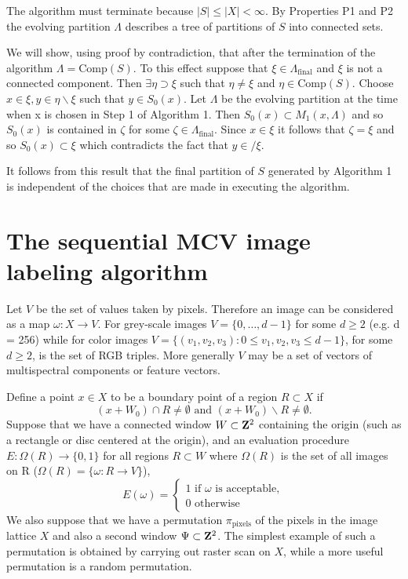 \documentclass[12pt,twoside]{article}
\newcommand{\slas}[1]{\mbox{${{#1} \!\!\! /}$}}
\begin{document}
The algorithm must terminate because $|S| \leq|X|< \infty$. By Properties P1 and P2 the evolving
partition $\Lambda$ describes a tree of partitions of $S$ into connected sets.

We will show, using proof by contradiction, that after the termination of the algorithm $\Lambda = \mbox{Comp}(S)$. To this effect suppose that $\xi\in \Lambda_{\mbox{final}}$ and $\xi$ is not a connected component. Then $\exists\eta\supset\xi$
such that $\eta\neq\xi$ and $\eta\in\mbox{Comp}(S)$. Choose $x \in \xi, y \in \eta\backslash\xi$  such that $y \in S_0(x)$. Let $\Lambda$ be the evolving partition at the time when x is chosen in Step 1 of Algorithm 1. Then $S_0(x) \subset M_1(x,\Lambda)$
and so $S_0(x)$ is contained in $\zeta$ for some $\zeta\in\Lambda_{\mbox{final}}$. Since $x \in \xi$ it follows that $\zeta=\xi$ and so $S_0(x) \subset\xi$ which contradicts the fact that $y {\slas \in}\xi$.

It follows from this result that the final partition of $S$ generated by Algorithm 1 is independent
of the choices that are made in executing the algorithm.

\section{The sequential MCV image labeling algorithm}

Let $V$ be the set of values taken by pixels. Therefore an image can be considered as a map $\omega : X\rightarrow V$. For
grey-scale images $V = \{0, \ldots, d-1\}$ for some $d \geq 2$ (e.g. d = 256) while for color images
$V = \{(v_1,v_2,v_3) : 0 \leq v_1, v_2, v_3 \leq d-1\}$, for some $d \geq 2$, is the set of RGB triples. More generally
$V$ may be a set of vectors of multispectral components or feature vectors.

Define a point $x\in X$ to be a boundary point of a region $R \subset X$ if
\begin{equation}
(x + W_0) \cap R \neq \emptyset \mbox{ and } (x + W_0) \backslash R \neq\emptyset.
\end{equation}
Suppose that we have a connected window $W \subset {\bf Z}^2$ containing the origin (such as a rectangle
or disc centered at the origin), and an evaluation procedure $E : \Omega(R) \rightarrow \{0,1\}$ for all regions
$ R \subset W$ where $\Omega(R)$ is the set of all images on R ($\Omega(R) = \{\omega : R \rightarrow V\}$),
\begin{equation}
E(\omega) = \left\{\begin{array}{l}
1 \mbox{ if $\omega$ is acceptable}, \\
0 \mbox{ otherwise}
\end{array}\right.
\end{equation}
We also suppose that we have a permutation $\pi_{\mbox{pixels}}$ of the pixels in the image lattice
$X$ and also a second window $\Psi\subset{\bf Z}^2$. The simplest example of such a permutation is obtained
by carrying out raster scan on $X$, while a more useful permutation is a random permutation.
\end{document}
